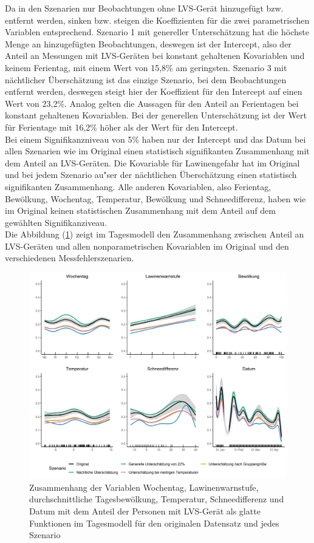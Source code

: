 \documentclass[12pt]{scrreprt}
\begin{document}
\noindent Da in den Szenarien nur Beobachtungen ohne LVS-Gerät hinzugefügt bzw. entfernt werden, sinken bzw. steigen die Koeffizienten für die zwei parametrischen Variablen entsprechend. Szenario 1 mit genereller Unterschätzung hat die höchste Menge an hinzugefügten Beobachtungen, deswegen ist der Intercept, also der Anteil an Messungen mit LVS-Geräten bei konstant gehaltenen Kovariablen und keinem Ferientag, mit einem Wert von 15,8\% am geringsten. Szenario 3 mit nächtlicher Überschätzung ist das einzige Szenario, bei dem Beobachtungen entfernt werden, deswegen steigt hier der Koeffizient für den Intercept auf einen Wert von 23,2\%. Analog gelten die Aussagen für den Anteil an Ferientagen bei konstant gehaltenen Kovariablen. Bei der generellen Unterschätzung ist der Wert für Ferientage mit 16,2\% höher als der Wert für den Intercept.\\
Bei einem Signifikanzniveau von 5\% haben nur der Intercept und das Datum bei allen Szenarien wie im Original einen statistisch signifikanten Zusammenhang mit dem Anteil an LVS-Geräten. Die Kovariable für Lawinengefahr hat im Original und bei jedem Szenario au"ser der nächtlichen Überschätzung einen statistisch signifikanten Zusammenhang. Alle anderen Kovariablen, also Ferientag, Bewölkung, Wochentag, Temperatur, Bewölkung und Schneedifferenz, haben wie im Original keinen statistischen Zusammenhang mit dem Anteil auf dem gewählten Signifikanziveau. \\
Die Abbildung (\ref{pic:day_model_comparison_plots}) zeigt im Tagesmodell den Zusammenhang zwischen Anteil an LVS-Geräten und allen nonparametrischen Kovariablen im Original und den verschiedenen Messfehlerszenarien.
\begin{figure}[H]
	\centering
	\includegraphics[width=\linewidth]{plots/day_model_comparison_plots}
	\caption{Zusammenhang der Variablen Wochentag, Lawinenwarnstufe, durchschnittliche Tagesbewölkung, Temperatur, Schneedifferenz und Datum mit dem Anteil der Personen mit LVS-Gerät als glatte Funktionen im Tagesmodell für den originalen Datensatz und jedes Szenario}
	\label{pic:day_model_comparison_plots}	
\end{figure}
\end{document}
